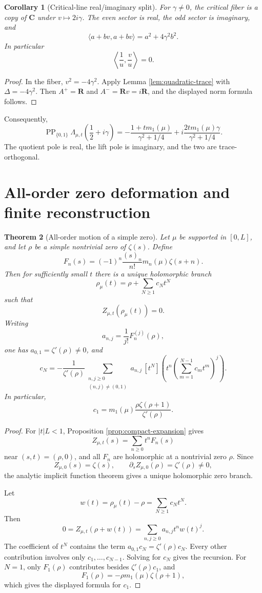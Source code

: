 \documentclass[11pt]{article}
\newcommand{\C}{\mathbf C}
\newcommand{\R}{\mathbf R}
\newcommand{\PP}{\operatorname{PP}}
\theoremstyle{plain}
\newtheorem{theorem}{Theorem}[section]
\newtheorem{corollary}[theorem]{Corollary}
\theoremstyle{definition}
\begin{document}
\begin{corollary}[Critical-line real/imaginary split]\label{cor:critical-split}
For \(\gamma\ne0\), the critical fiber is a copy of \(\C\) under \(v\mapsto 2i\gamma\).  The even sector is real, the odd sector is imaginary, and
\[
   \langle a+bv,a+bv\rangle=a^2+4\gamma^2b^2.
\]
In particular
\[
   \left\langle \frac1u,\frac vu\right\rangle=0.
\]
\end{corollary}

\begin{proof}
In the fiber, \(v^2=-4\gamma^2\).  Apply Lemma \ref{lem:quadratic-trace} with \(\Delta=-4\gamma^2\).  Then \(A^+=\R\) and \(A^-=\R v=i\R\), and the displayed norm formula follows.
\end{proof}

Consequently,
\[
 \PP_{\{0,1\}}\Lambda_{\mu,t}\left(\frac12+i\gamma\right)
 =-\frac{1+t m_1(\mu)}{\gamma^2+1/4}
 +i\frac{2t m_1(\mu)\gamma}{\gamma^2+1/4}.
\]
The quotient pole is real, the lift pole is imaginary, and the two are trace-orthogonal.

\section{All-order zero deformation and finite reconstruction}

\begin{theorem}[All-order motion of a simple zero]\label{thm:zero-motion}
Let \(\mu\) be supported in \([0,L]\), and let \(\rho\) be a simple nontrivial zero of \(\zeta(s)\).  Define
\[
   F_n(s)=(-1)^n\frac{(s)_n}{n!}m_n(\mu)\zeta(s+n).
\]
Then for sufficiently small \(t\) there is a unique holomorphic branch
\[
   \rho_\mu(t)=\rho+\sum_{N\ge1}c_Nt^N
\]
such that
\[
   Z_{\mu,t}(\rho_\mu(t))=0.
\]
Writing
\[
   a_{n,j}=\frac1{j!}F_n^{(j)}(\rho),
\]
one has \(a_{0,1}=\zeta'(\rho)\ne0\), and
\[
 c_N=-\frac1{\zeta'(\rho)}
 \sum_{\substack{n,j\ge0\\(n,j)\ne(0,1)}}
 a_{n,j}\,[t^N]\left(t^n\left(\sum_{m=1}^{N-1}c_mt^m\right)^j\right).
\]
In particular,
\[
   c_1=m_1(\mu)\frac{\rho\zeta(\rho+1)}{\zeta'(\rho)}.
\]
\end{theorem}

\begin{proof}
For \(|t|L<1\), Proposition \ref{prop:compact-expansion} gives
\[
   Z_{\mu,t}(s)=\sum_{n\ge0}t^nF_n(s)
\]
near \((s,t)=(\rho,0)\), and all \(F_n\) are holomorphic at a nontrivial zero \(\rho\).  Since
\[
   Z_{\mu,0}(s)=\zeta(s),
   \qquad
   \partial_s Z_{\mu,0}(\rho)=\zeta'(\rho)\ne0,
\]
the analytic implicit function theorem gives a unique holomorphic zero branch.

Let
\[
   w(t)=\rho_\mu(t)-\rho=\sum_{N\ge1}c_Nt^N.
\]
Then
\[
   0=Z_{\mu,t}(\rho+w(t))=\sum_{n,j\ge0}a_{n,j}t^n w(t)^j.
\]
The coefficient of \(t^N\) contains the term \(a_{0,1}c_N=\zeta'(\rho)c_N\).  Every other contribution involves only \(c_1,\ldots,c_{N-1}\).  Solving for \(c_N\) gives the recursion.  For \(N=1\), only \(F_1(\rho)\) contributes besides \(\zeta'(\rho)c_1\), and
\[
   F_1(\rho)=-\rho m_1(\mu)\zeta(\rho+1),
\]
which gives the displayed formula for \(c_1\).
\end{proof}
\end{document}
